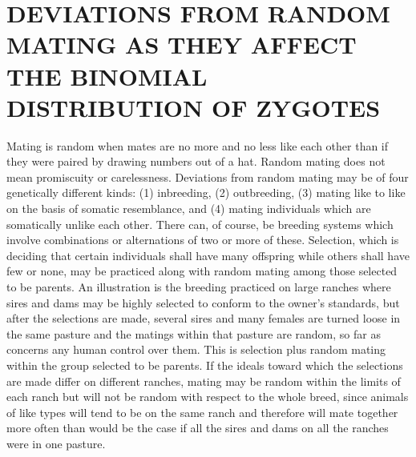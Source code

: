 \section*{DEVIATIONS FROM RANDOM MATING AS THEY AFFECT THE BINOMIAL DISTRIBUTION OF ZYGOTES}

Mating is random when mates are no more and no less like each
other than if they were paired by drawing numbers out of a hat. Random
mating does not mean promiscuity or carelessness. Deviations
from random mating may be of four genetically different kinds: (1)
inbreeding, (2) outbreeding, (3) mating like to like on the basis of
somatic resemblance, and (4) mating individuals which are somatically
unlike each other. There can, of course, be breeding systems which
involve combinations or alternations of two or more of these. Selection,
which is deciding that certain individuals shall have many offspring
while others shall have few or none, may be practiced along with
random mating among those selected to be parents. An illustration is
the breeding practiced on large ranches where sires and dams may be
highly selected to conform to the owner's standards, but after the selections
are made, several sires and many females are turned loose in the
same pasture and the matings within that pasture are random, so far as
concerns any human control over them. This is selection plus random
mating within the group selected to be parents. If the ideals toward
which the selections are made differ on different ranches, mating may
be random within the limits of each ranch but will not be random with
respect to the whole breed, since animals of like types will tend to be on
the same ranch and therefore will mate together more often than would
be the case if all the sires and dams on all the ranches were in one pasture.

